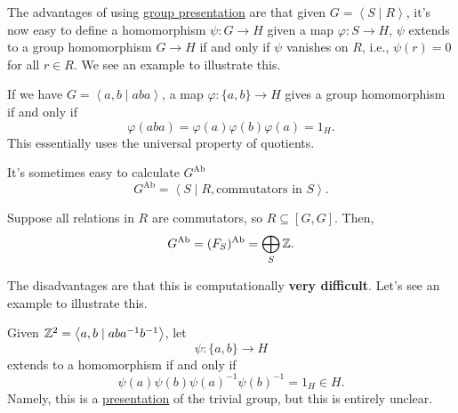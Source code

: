 \begin{remark}
	The advantages of using \hyperref[def:group-presentation]{group presentation} are that given \(G = \left< S \mid R \right> \), it's now easy to define
	a homomorphism \(\psi \colon G\to H\) given a map \(\varphi \colon S\to H\), \(\psi \) extends to a group homomorphism \(G\to H\) if and only if \(\psi \)
	vanishes on \(R\), i.e., \(\psi (r) = 0\) for all \(r\in R\). We see an example to illustrate this.

	\begin{eg}
		If we have \(G = \left< a, b \mid aba \right> \), a map \(\varphi \colon \{a, b\}\to H\) gives a group homomorphism if and only if
		\[
			\varphi (aba) = \varphi (a)\varphi (b)\varphi (a) = 1_H.
		\]
		This essentially uses the universal property of quotients.
	\end{eg}
\end{remark}

\begin{remark}
	It's sometimes easy to calculate \(G^{\mathrm{Ab}}\)
	\[
		G^{\mathrm{Ab}} = \left< S \mid R, \text{commutators in \(S\)}\right>.
	\]
	\begin{eg}
		Suppose all relations in \(R\) are commutators, so \(R\subseteq[G, G]\). Then,
		\[
			G^{\mathrm{Ab}} = (F_S)^{\mathrm{Ab}} = \bigoplus_S \mathbb{\MakeUppercase{z}}.
		\]
	\end{eg}
\end{remark}
\begin{remark}
	The disadvantages are that this is computationally \textbf{very difficult}. Let's see an example to illustrate this.
	\begin{eg}
		Given \(\mathbb{\MakeUppercase{z}} ^2 = \left< a, b \mid aba^{-1} b^{-1}  \right> \), let
		\[
			\psi \colon \{a, b\}\to H
		\]
		extends to a homomorphism if and only if
		\[
			\psi (a)\psi (b)\psi (a)^{-1} \psi (b)^{-1} = 1_H\in H.
		\]
		Namely, this is a \hyperref[def:group-presentation]{presentation} of the trivial group, but this is entirely unclear.
	\end{eg}
\end{remark}